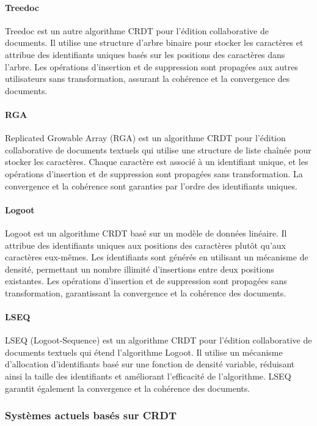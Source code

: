 \paragraph{Treedoc}
Treedoc est un autre algorithme CRDT pour l'édition collaborative de documents. Il utilise une structure d'arbre binaire pour stocker les caractères et attribue des identifiants uniques basés sur les positions des caractères dans l'arbre. Les opérations d'insertion et de suppression sont propagées aux autres utilisateurs sans transformation, assurant la cohérence et la convergence des documents.

\paragraph{RGA}
Replicated Growable Array (RGA) est un algorithme CRDT pour l'édition collaborative de documents textuels qui utilise une structure de liste chaînée pour stocker les caractères. Chaque caractère est associé à un identifiant unique, et les opérations d'insertion et de suppression sont propagées sans transformation. La convergence et la cohérence sont garanties par l'ordre des identifiants uniques.

\paragraph{Logoot}
Logoot est un algorithme CRDT basé sur un modèle de données linéaire. Il attribue des identifiants uniques aux positions des caractères plutôt qu'aux caractères eux-mêmes. Les identifiants sont générés en utilisant un mécanisme de densité, permettant un nombre illimité d'insertions entre deux positions existantes. Les opérations d'insertion et de suppression sont propagées sans transformation, garantissant la convergence et la cohérence des documents.

\paragraph{LSEQ}
LSEQ (Logoot-Sequence) est un algorithme CRDT pour l'édition collaborative de documents textuels qui étend l'algorithme Logoot. Il utilise un mécanisme d'allocation d'identifiants basé sur une fonction de densité variable, réduisant ainsi la taille des identifiants et améliorant l'efficacité de l'algorithme. LSEQ garantit également la convergence et la cohérence des documents.

\subsubsection{Systèmes actuels basés sur CRDT}

